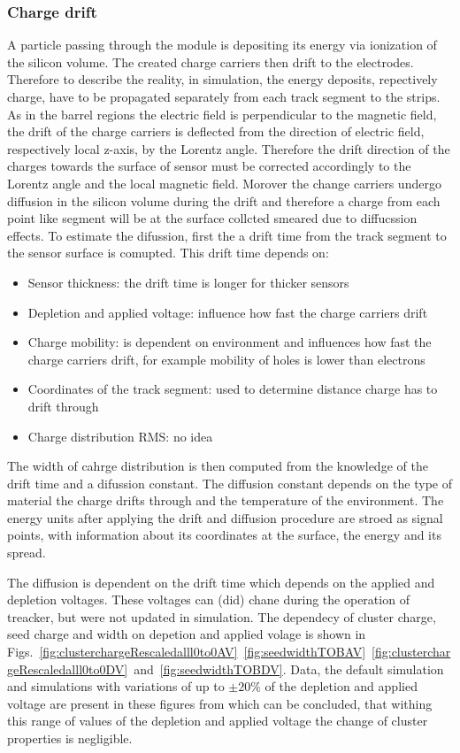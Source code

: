 \subsubsection{Charge drift}

A particle passing through the module is depositing its energy via ionization of the silicon volume. The created charge carriers then drift to the electrodes. Therefore to describe the reality, in simulation, the energy deposits, repectively charge, have to be propagated separately from each track segment to the strips. As in the barrel regions the electric field is perpendicular to the magnetic field, the drift of the charge carriers is deflected from the direction of electric field, respectively local z-axis, by the Lorentz angle. Therefore the drift direction of the charges towards the surface of sensor must be corrected accordingly to the Lorentz angle and the local magnetic field. Morover the change carriers undergo diffusion in the silicon volume during the drift and therefore a charge from each point like segment will be at the surface collcted smeared due to diffucssion effects. To estimate the difussion, first the a drift time from the track segment to the sensor surface is comupted. This drift time depends on:

\begin{itemize}
\item Sensor thickness: the drift time is longer for thicker sensors
\item Depletion and applied voltage: influence how fast the charge carriers drift
\item Charge mobility: is dependent on environment and influences how fast the charge carriers drift, for example mobility of holes is lower than electrons
\item Coordinates of the track segment: used to determine distance charge has to drift through
\item Charge distribution RMS: no idea %
\end{itemize}

The width of cahrge distribution is then computed from the knowledge of the drift time and a difussion constant. The diffusion constant depends on the type of material the charge drifts through and the temperature of the environment. The energy units after applying the drift and diffusion procedure are stroed as signal points, with information about its coordinates at the surface, the energy and its spread.

The diffusion is dependent on the drift time which depends on the applied and depletion voltages. These voltages can (did) chane during the operation of treacker, but were not updated in simulation. The dependecy of cluster charge, seed charge and width on depetion and applied volage is shown in Figs.~\ref{fig:clusterchargeRescaledalll0to0AV}~\ref{fig:seedwidthTOBAV}~\ref{fig:clusterchargeRescaledalll0to0DV}~and~\ref{fig:seedwidthTOBDV}. Data, the default simulation and simulations with variations of up to $\pm 20\%$ of the depletion and applied voltage are present in these figures from which can be concluded, that withing this range of values of the depletion and applied voltage the change of cluster properties is negligible.


